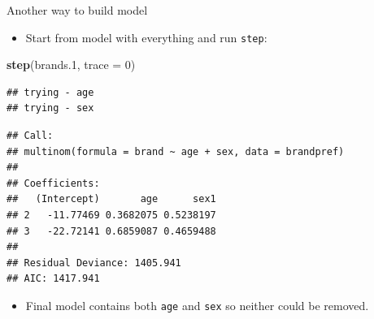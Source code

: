 \documentclass[
  ignorenonframetext,
]{beamer}
\newenvironment{Shaded}{\begin{snugshade}}{\end{snugshade}}
\newcommand{\DataTypeTok}[1]{\textcolor[rgb]{0.13,0.29,0.53}{#1}}
\newcommand{\DecValTok}[1]{\textcolor[rgb]{0.00,0.00,0.81}{#1}}
\newcommand{\FloatTok}[1]{\textcolor[rgb]{0.00,0.00,0.81}{#1}}
\newcommand{\KeywordTok}[1]{\textcolor[rgb]{0.13,0.29,0.53}{\textbf{#1}}}
\newcommand{\NormalTok}[1]{#1}
\providecommand{\tightlist}{%
  \setlength{\itemsep}{0pt}\setlength{\parskip}{0pt}}
\begin{document}
\begin{frame}[fragile]{Another way to build model}
\protect\hypertarget{another-way-to-build-model}{}

\begin{itemize}
\tightlist
\item
  Start from model with everything and run \texttt{step}:
\end{itemize}

\footnotesize

\begin{Shaded}
\begin{Highlighting}[]
\KeywordTok{step}\NormalTok{(brands}\FloatTok{.1}\NormalTok{, }\DataTypeTok{trace =} \DecValTok{0}\NormalTok{)}
\end{Highlighting}
\end{Shaded}

\begin{verbatim}
## trying - age 
## trying - sex
\end{verbatim}

\begin{verbatim}
## Call:
## multinom(formula = brand ~ age + sex, data = brandpref)
## 
## Coefficients:
##   (Intercept)       age      sex1
## 2   -11.77469 0.3682075 0.5238197
## 3   -22.72141 0.6859087 0.4659488
## 
## Residual Deviance: 1405.941 
## AIC: 1417.941
\end{verbatim}

\normalsize

\begin{itemize}
\tightlist
\item
  Final model contains both \texttt{age} and \texttt{sex} so neither
  could be removed.
\end{itemize}

\end{frame}
\end{document}
